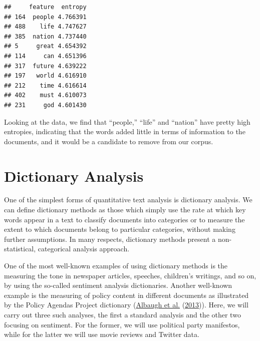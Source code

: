 \documentclass[
]{book}
\newenvironment{Shaded}{\begin{snugshade}}{\end{snugshade}}
\newcommand{\DecValTok}[1]{\textcolor[rgb]{0.00,0.00,0.81}{#1}}
\newcommand{\FunctionTok}[1]{\textcolor[rgb]{0.00,0.00,0.00}{#1}}
\newcommand{\NormalTok}[1]{#1}
\newcommand{\OtherTok}[1]{\textcolor[rgb]{0.56,0.35,0.01}{#1}}
\newcommand{\SpecialCharTok}[1]{\textcolor[rgb]{0.00,0.00,0.00}{#1}}
\newcommand{\StringTok}[1]{\textcolor[rgb]{0.31,0.60,0.02}{#1}}
\begin{document}
\begin{Shaded}
\end{Shaded}

\begin{verbatim}
##     feature  entropy
## 164  people 4.766391
## 488    life 4.747627
## 385  nation 4.737440
## 5     great 4.654392
## 114     can 4.651396
## 317  future 4.639222
## 197   world 4.616910
## 212    time 4.616614
## 402    must 4.610073
## 231     god 4.601430
\end{verbatim}

Looking at the data, we find that ``people,'' ``life'' and ``nation'' have pretty high entropies, indicating that the words added little in terms of information to the documents, and it would be a candidate to remove from our corpus.

\hypertarget{dictionary-analysis}{%
\chapter{Dictionary Analysis}\label{dictionary-analysis}}

One of the simplest forms of quantitative text analysis is dictionary analysis. We can define dictionary methods as those which simply use the rate at which key words appear in a text to classify documents into categories or to measure the extent to which documents belong to particular categories, without making further assumptions. In many respects, dictionary methods present a non-statistical, categorical analysis approach.

One of the most well-known examples of using dictionary methods is the measuring the tone in newspaper articles, speeches, children's writings, and so on, by using the so-called sentiment analysis dictionaries. Another well-known example is the measuring of policy content in different documents as illustrated by the Policy Agendas Project dictionary (\protect\hyperlink{ref-Albaugh2013}{Albaugh et al.} (\protect\hyperlink{ref-Albaugh2013}{2013})). Here, we will carry out three such analyses, the first a standard analysis and the other two focusing on sentiment. For the former, we will use political party manifestos, while for the latter we will use movie reviews and Twitter data.
\end{document}
